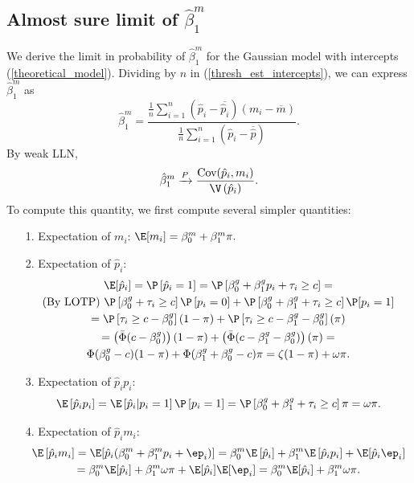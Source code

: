 \documentclass[12pt]{article}
\begin{document}
\begin{appendices}
\subsection{Almost sure limit of $\hat{\beta}^m_1$}\label{sec:convergence}

We derive the limit in probability of $\hat{\beta}^m_1$ for the Gaussian model with intercepts (\ref{theoretical_model}). Dividing by $n$ in (\ref{thresh_est_intercepts}), we can express $\hat{\beta}^m_1$ as
$$ \hat{\beta}^m_1 = \frac{ \frac{1}{n} \sum_{i=1}^n ( \hat{p}_i - \overline{\hat{p}_i})(m_i - \overline{m})}{ \frac{1}{n} \sum_{i=1}^n (\hat{p}_i - \overline{\hat{p}})}.$$ By weak LLN,
$$ \hat{\beta}^m_1 \xrightarrow{P} \frac{\textrm{Cov}(\hat{p}_i, m_i)}{\V\left(\hat{p}_i\right)}.$$ To compute this quantity, we first compute several simpler quantities:
\begin{itemize}
\item[1.] Expectation of $m_i$: $\E[m_i] = \beta^m_0 + \beta^m_1\pi.$
\item[2.] Expectation of $\hat{p}_i$: \begin{multline*}
\E[\hat{p}_i] = \P\left[\hat{p}_i = 1\right] = \P\left[\beta^g_0 + \beta^g_1 p_i + \tau_i \geq c \right] = \\ \textrm{(By LOTP) } \P\left[ \beta^g_0 + \tau_i \geq c \right]\P\left[p_i = 0\right] + \P\left[ \beta^g_0 + \beta^g_1 + \tau_i \geq c \right] \P[p_i = 1] \\ = \P\left[ \tau_i \geq c - \beta^g_0\right](1- \pi) + \P\left[ \tau_i \geq c - \beta^g_1 - \beta^g_0 \right](\pi) \\ =  \left(\bar{\Phi}(c - \beta^g_0) \right) (1 - \pi) + \left( \bar{\Phi}(c - \beta^g_1 - \beta^g_0) \right)(\pi) = \\  \Phi(\beta^g_0 - c) (1-\pi) + \Phi(\beta^g_1 + \beta^g_0 - c) \pi = \zeta(1-\pi) + \omega \pi.
\end{multline*}
\item[3.] Expectation of $\hat{p}_i p_i$: 
$$\E\left[ \hat{p}_i p_i \right] = \E\left[\hat{p}_i | p_i = 1 \right] \P\left[ p_i =1 \right] = \P\left[ \beta^g_0 + \beta^g_1 + \tau_i \geq c \right] \pi = \omega \pi.$$
\item[4.] Expectation of $\hat{p}_i m_i$:
\begin{multline*}
\E\left[\hat{p}_i m_i\right] = \E[\hat{p}_i (\beta^m_0 + \beta^m_1 p_i + \ep_i)] = \beta^m_0 \E\left[\hat{p}_i\right] + \beta^m_1 \E\left[\hat{p}_i p_i\right] + \E[\hat{p}_i \ep_i] \\ = \beta^m_0 \E[\hat{p}_i] + \beta^m_1 \omega \pi + \E[\hat{p}_i] \E[\ep_i] = \beta^m_0 \E[\hat{p}_i] + \beta^m_1 \omega \pi.

\end{multline*}
\end{itemize}
\end{appendices}
\end{document}
